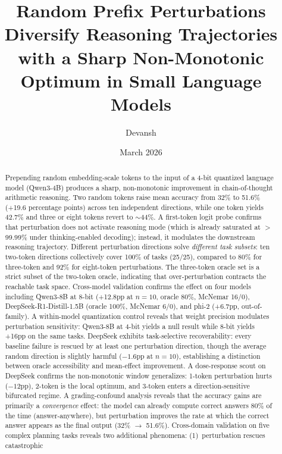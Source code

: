 \documentclass{article}
\title{Random Prefix Perturbations Diversify Reasoning Trajectories\\with a Sharp Non-Monotonic Optimum in Small Language Models}
\author{Devansh}
\date{March 2026}
\begin{document}
\maketitle

\begin{abstract}
Prepending random embedding-scale tokens to the input of a 4-bit quantized
language model (Qwen3-4B) produces a sharp, non-monotonic improvement in
chain-of-thought arithmetic reasoning. Two random tokens raise mean
accuracy from 32\% to 51.6\% (+19.6 percentage points) across ten
independent directions, while one token yields 42.7\% and three or eight
tokens revert to $\sim$44\%. A first-token logit probe confirms that
perturbation does not activate reasoning mode (which is already
saturated at $>$99.99\% under thinking-enabled decoding); instead,
it modulates the downstream reasoning trajectory. Different
perturbation directions solve \emph{different task subsets}: ten two-token
directions collectively cover 100\% of tasks (25/25), compared to 80\%
for three-token and 92\% for eight-token perturbations. The three-token
oracle set is a strict subset of the two-token oracle, indicating that
over-perturbation contracts the reachable task space. Cross-model validation confirms the effect on four models including
Qwen3-8B at 8-bit (+12.8pp at $n{=}10$, oracle 80\%,
McNemar 16/0), DeepSeek-R1-Distill-1.5B (oracle 100\%,
McNemar 6/0), and phi-2 (+6.7pp, out-of-family). A within-model
quantization control reveals that weight precision modulates
perturbation sensitivity: Qwen3-8B at 4-bit yields a null result
while 8-bit yields +16pp on the same tasks. DeepSeek exhibits
task-selective recoverability: every baseline failure is rescued by at
least one perturbation direction, though the average random direction
is slightly harmful ($-1.6$pp at $n{=}10$), establishing a
distinction between oracle accessibility and mean-effect improvement.
A dose-response scout on DeepSeek confirms the non-monotonic window
generalizes: 1-token perturbation hurts ($-12$pp), 2-token is the
local optimum, and 3-token enters a direction-sensitive bifurcated
regime. A grading-confound analysis reveals that the accuracy gains are
primarily a \emph{convergence} effect: the model can already compute
correct answers 80\% of the time (answer-anywhere), but perturbation
improves the rate at which the correct answer appears as the final
output (32\% $\to$ 51.6\%).
Cross-domain validation on five complex planning tasks reveals two
additional phenomena: (1)~perturbation rescues catastrophic

\end{abstract}
\end{document}
